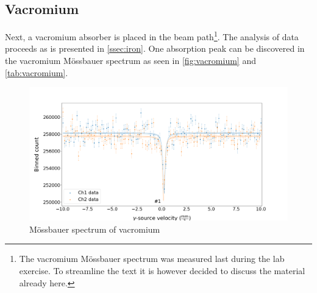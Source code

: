 
\subsection{Vacromium}
\label{ssec:vacromium}

Next, a vacromium absorber is placed in the beam path\footnote{The vacromium
Mössbauer spectrum was measured last during the lab exercise. To streamline the text
it is however decided to discuss the material already here.}. The analysis of data
proceeds as is presented in \autoref{ssec:iron}. One absorption peak can be
discovered in the vacromium Mössbauer spectrum as seen in \autoref{fig:vacromium} and
\autoref{tab:vacromium}.



\begin{figure}
	\centering
	\includegraphics[width=1.0\textwidth]{./fig/Vacromium.png}
	\caption{Mössbauer spectrum of vacromium}
	\label{fig:vacromium}
\end{figure}


